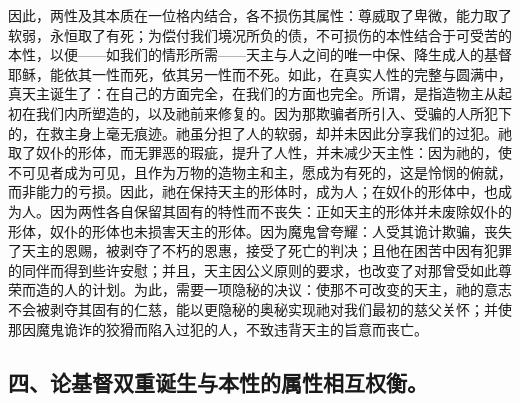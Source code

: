 因此，两性及其本质在一位格内结合，各不损伤其属性：尊威取了卑微，能力取了软弱，永恒取了有死；为偿付我们境况所负的债，不可损伤的本性结合于可受苦的本性，以便——如我们的情形所需——天主与人之间的唯一中保、降生成人的基督耶稣，能依其一性而死，依其另一性而不死。如此，在真实人性的完整与圆满中，真天主诞生了：在自己的方面完全，在我们的方面也完全。所谓，是指造物主从起初在我们内所塑造的，以及祂前来修复的。因为那欺骗者所引入、受骗的人所犯下的，在救主身上毫无痕迹。祂虽分担了人的软弱，却并未因此分享我们的过犯。祂取了奴仆的形体，而无罪恶的瑕疵，提升了人性，并未减少天主性：因为祂的，使不可见者成为可见，且作为万物的造物主和主，愿成为有死的，这是怜悯的俯就，而非能力的亏损。因此，祂在保持天主的形体时，成为人；在奴仆的形体中，也成为人。因为两性各自保留其固有的特性而不丧失：正如天主的形体并未废除奴仆的形体，奴仆的形体也未损害天主的形体。因为魔鬼曾夸耀：人受其诡计欺骗，丧失了天主的恩赐，被剥夺了不朽的恩惠，接受了死亡的判决；且他在困苦中因有犯罪的同伴而得到些许安慰；并且，天主因公义原则的要求，也改变了对那曾受如此尊荣而造的人的计划。为此，需要一项隐秘的决议：使那不可改变的天主，祂的意志不会被剥夺其固有的仁慈，能以更隐秘的奥秘实现祂对我们最初的慈父关怀；并使那因魔鬼诡诈的狡猾而陷入过犯的人，不致违背天主的旨意而丧亡。\par


\subsection{四、论基督双重诞生与本性的属性相互权衡。}

